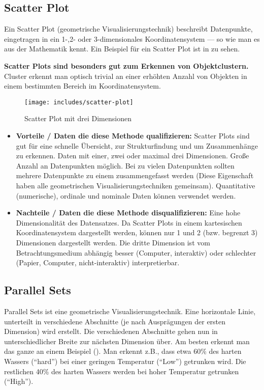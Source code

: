 \documentclass[a4paper,12pt,ngerman]{scrartcl}
\begin{document}
\subsection*{Scatter Plot}
Ein Scatter Plot (geometrische Visualisierungstechnik) beschreibt Datenpunkte, eingetragen in ein 1-,2- oder 3-dimensionales Koordinatensystem --- so wie man es aus der Mathematik kennt. Ein Beispiel für ein Scatter Plot ist in  zu sehen.

\textbf{Scatter Plots sind besonders gut zum Erkennen von Objektclustern.} Cluster erkennt man optisch trivial an einer erhöhten Anzahl von Objekten in einem bestimmten Bereich im Koordinatensystem.

\begin{figure}[ht]
    \centering
    \texttt{[image: includes/scatter-plot]}
    \caption{Scatter Plot mit drei Dimensionen}
    \label{fig:scatter-plot}
\end{figure}

\begin{itemize}
	\item \textbf{Vorteile / Daten die diese Methode qualifizieren:}
	Scatter Plots sind gut für eine schnelle Übersicht, zur Strukturfindung und um Zusammenhänge zu erkennen. Daten mit einer, zwei oder maximal drei Dimensionen. Große Anzahl an Datenpunkten möglich. Bei zu vielen Datenpunkten sollten mehrere Datenpunkte zu einem zusammengefasst werden (Diese Eigenschaft haben alle geometrischen Visualisierungstechniken gemeinsam). Quantitative (numerische), ordinale und nominale Daten können verwendet werden.

	\item \textbf{Nachteile / Daten die diese Methode disqualifizieren:}
	Eine hohe Dimensionalität des Datensatzes. Da Scatter Plots in einem kartesischen Koordinatensystem dargestellt werden, können nur 1 und 2 (bzw. begrenzt 3) Dimensionen dargestellt werden. Die dritte Dimension ist vom Betrachtungsmedium abhängig besser (Computer, interaktiv) oder schlechter (Papier, Computer, nicht-interaktiv) interpretierbar.
\end{itemize}

\subsection*{Parallel Sets}
Parallel Sets ist eine geometrische Visualisierungstechnik. Eine horizontale Linie, unterteilt in verschiedene Abschnitte (je nach Ausprägungen der ersten Dimension) wird erstellt. Die verschiedenen Abschnitte gehen nun in unterschiedlicher Breite zur nächsten Dimension über. Am besten erkennt man das ganze an einem Beispiel (). Man erkennt z.B., dass etwa 60\% des harten Wassers (\enquote{hard}) bei einer geringen Temperatur (\enquote{Low}) getrunken wird. Die restlichen 40\% des harten Wassers werden bei hoher Temperatur getrunken (\enquote{High}).
\end{document}
